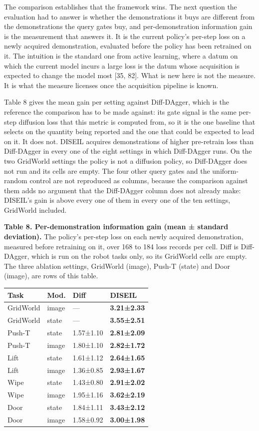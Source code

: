 \documentclass[
  11pt,
]{article}
\begin{document}
The comparison establishes that the framework wins. The next question
the evaluation had to answer is whether the demonstrations it buys are
different from the demonstrations the query gates buy, and
per-demonstration information gain is the measurement that answers it.
It is the current policy's per-step loss on a newly acquired
demonstration, evaluated before the policy has been retrained on it. The
intuition is the standard one from active learning, where a datum on
which the current model incurs a large loss is the datum whose
acquisition is expected to change the model most {[}35, 82{]}. What is
new here is not the measure. It is what the measure licenses once the
acquisition pipeline is known.

Table 8 gives the mean gain per setting against Diff-DAgger, which is
the reference the comparison has to be made against: its gate signal is
the same per-step diffusion loss that this metric is computed from, so
it is the one baseline that selects on the quantity being reported and
the one that could be expected to lead on it. It does not. DISEIL
acquires demonstrations of higher pre-retrain loss than Diff-DAgger in
every one of the eight settings in which Diff-DAgger runs. On the two
GridWorld settings the policy is not a diffusion policy, so Diff-DAgger
does not run and its cells are empty. The four other query gates and the
uniform-random control are not reproduced as columns, because the
comparison against them adds no argument that the Diff-DAgger column
does not already make: DISEIL's gain is above every one of them in every
one of the ten settings, GridWorld included.

\textbf{Table 8. Per-demonstration information gain (mean ± standard
deviation).} The policy's per-step loss on each newly acquired
demonstration, measured before retraining on it, over 168 to 184 loss
records per cell. Diff is Diff-DAgger, which is run on the robot tasks
only, so its GridWorld cells are empty. The three ablation settings,
GridWorld (image), Push-T (state) and Door (image), are rows of this
table.

\begin{longtable}[]{@{}llll@{}}
\toprule
Task & Mod. & Diff & DISEIL\tabularnewline
\midrule
\endhead
GridWorld & image & --- & \textbf{3.21±2.33}\tabularnewline
GridWorld & state & --- & \textbf{3.55±2.51}\tabularnewline
Push-T & state & 1.57±1.10 & \textbf{2.81±2.09}\tabularnewline
Push-T & image & 1.80±1.10 & \textbf{2.82±1.72}\tabularnewline
Lift & state & 1.61±1.12 & \textbf{2.64±1.65}\tabularnewline
Lift & image & 1.36±0.85 & \textbf{2.93±1.67}\tabularnewline
Wipe & state & 1.43±0.80 & \textbf{2.91±2.02}\tabularnewline
Wipe & image & 1.95±1.16 & \textbf{3.62±2.19}\tabularnewline
Door & state & 1.84±1.11 & \textbf{3.43±2.12}\tabularnewline
Door & image & 1.58±0.92 & \textbf{3.00±1.98}\tabularnewline
\bottomrule
\end{longtable}
\end{document}
